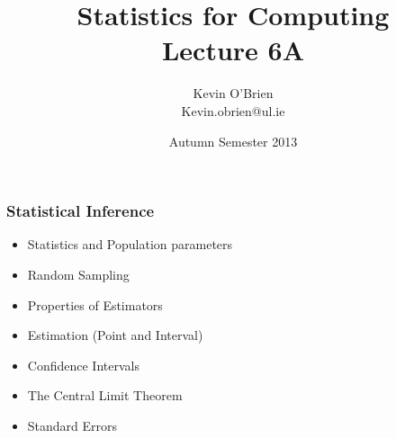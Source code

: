 \documentclass[a4]{beamer}
\title[MA4413]{Statistics for Computing \\ {\normalsize Lecture 6A}}
\author[Kevin O'Brien]{Kevin O'Brien \\ {\scriptsize Kevin.obrien@ul.ie}}
\date{Autumn Semester 2013}
\institute[Maths \& Stats]{Dept. of Mathematics \& Statistics, \\ University \textit{of} Limerick}
\begin{document}
\begin{frame}
\titlepage
\end{frame}


\begin{frame}
\frametitle{Statistical Inference}

\begin{itemize}
\item Statistics and Population parameters
\item Random Sampling
\item Properties of Estimators
\item Estimation (Point and Interval)
\item Confidence Intervals
\item The Central Limit Theorem
\item Standard Errors
\end{itemize}


\end{frame}


\end{document}
